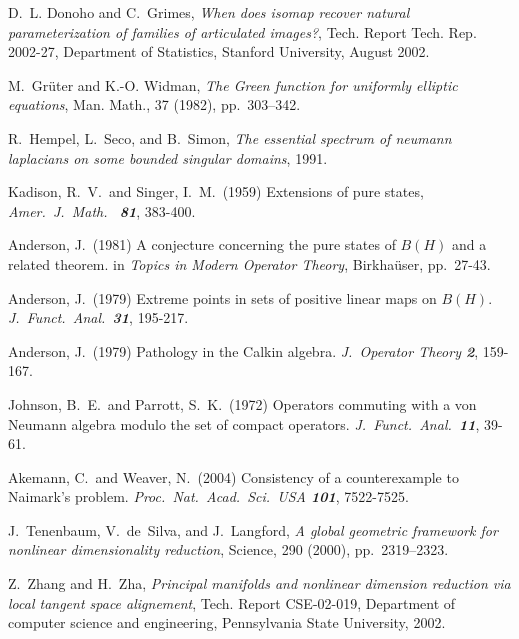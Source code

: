 \documentclass{amsart}
\theoremstyle{definition}
\theoremstyle{remark}
\numberwithin{equation}{section}
\begin{document}
\begin{thebibliography}{10}
D.~L. Donoho and C.~Grimes, {\em When does isomap recover natural
  parameterization of families of articulated images?}, Tech. Report Tech. Rep.
  2002-27, Department of Statistics, Stanford University, August 2002.

M.~Gr\"uter and K.-O. Widman, {\em The {G}reen function for uniformly
  elliptic equations}, Man. Math., 37 (1982), pp.~303--342.

R.~Hempel, L.~Seco, and B.~Simon, {\em The essential spectrum of neumann
  laplacians on some bounded singular domains}, 1991.

Kadison, R.\ V.\ and Singer, I.\ M.\ (1959)
Extensions of pure states, {\it Amer.\ J.\ Math.\ \bf
81}, 383-400.

Anderson, J.\ (1981) A conjecture concerning the pure states of
$B(H)$ and a related theorem. in {\it Topics in Modern Operator
Theory}, Birkha\"user, pp.\ 27-43.

Anderson, J.\ (1979) Extreme points in sets of
positive linear maps on $B(H)$. {\it J.\ Funct.\
Anal.\
\bf 31}, 195-217.

Anderson, J.\ (1979) Pathology in the Calkin algebra. {\it J.\
Operator Theory \bf 2}, 159-167.

\bibitem{5}
Johnson, B.\ E.\ and Parrott, S.\ K.\ (1972) Operators commuting
with a von Neumann algebra modulo the set of compact operators.
{\it J.\ Funct.\ Anal.\ \bf 11}, 39-61.

\bibitem{6}
Akemann, C.\ and Weaver, N.\ (2004) Consistency of a
counterexample to Naimark's problem. {\it Proc.\ Nat.\ Acad.\
Sci.\ USA \bf 101}, 7522-7525.

\bibitem{TSL}
J.~Tenenbaum, V.~de~Silva, and J.~Langford, {\em A global geometric
  framework for nonlinear dimensionality reduction}, Science, 290 (2000),
  pp.~2319--2323.

\bibitem{ZhaZha}
Z.~Zhang and H.~Zha, {\em Principal manifolds and nonlinear dimension
  reduction via local tangent space alignement}, Tech. Report CSE-02-019,
  Department of computer science and engineering, Pennsylvania State
  University, 2002.
\end{thebibliography}
\end{document}
